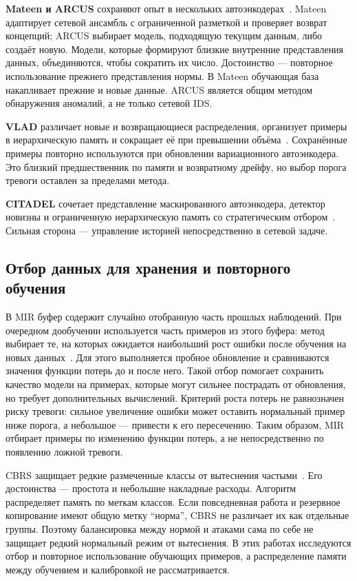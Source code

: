 \textbf{Mateen и ARCUS} сохраняют опыт в нескольких
автоэнкодерах~\cite{Mateen2024,ARCUS2022}. Mateen адаптирует
сетевой ансамбль с ограниченной разметкой и проверяет возврат
концепций; ARCUS выбирает модель, подходящую текущим данным,
либо создаёт новую. Модели, которые формируют близкие внутренние
представления данных, объединяются, чтобы сократить их число.
Достоинство --- повторное использование
прежнего представления нормы. В Mateen обучающая
база накапливает прежние и новые данные. ARCUS является общим
методом обнаружения аномалий, а не только сетевой IDS.

\textbf{VLAD} различает новые и возвращающиеся распределения,
организует примеры в иерархическую память и сокращает её при
превышении объёма~\cite{VLAD2023}. Сохранённые примеры повторно используются при
обновлении вариационного автоэнкодера. Это близкий предшественник
по памяти и возвратному дрейфу, но выбор порога тревоги
оставлен за пределами метода.

\textbf{CITADEL} сочетает представление маскированного автоэнкодера,
детектор новизны и ограниченную иерархическую память со
стратегическим отбором~\cite{CITADEL2025,CITADEL2026}. Сильная
сторона --- управление историей непосредственно в сетевой задаче.

\subsection{Отбор данных для хранения и повторного \texorpdfstring{\mbox{обучения}}{обучения}}
\label{subsec:related_retrieval}

В MIR буфер содержит случайно отобранную часть прошлых наблюдений.
При очередном дообучении используется часть примеров из этого
буфера: метод выбирает те, на которых ожидается наибольший рост
ошибки после обучения на новых данных~\cite{MIR2019}.
Для этого выполняется пробное обновление и сравниваются значения
функции потерь до и после него. Такой отбор помогает сохранить
качество модели на примерах, которые могут сильнее пострадать
от обновления, но требует дополнительных вычислений.
Критерий роста потерь не равнозначен риску тревоги:
сильное увеличение ошибки может оставить нормальный пример ниже
порога, а небольшое --- привести к его пересечению.
Таким образом, MIR отбирает примеры по изменению функции потерь,
а не непосредственно по появлению ложной тревоги.

CBRS защищает редкие размеченные классы от вытеснения
частыми~\cite{CBRS2020}. Его достоинства --- простота
и небольшие накладные расходы. Алгоритм распределяет память
по меткам классов. Если повседневная работа и резервное
копирование имеют общую метку \enquote{норма}, CBRS не различает
их как отдельные группы. Поэтому балансировка между нормой
и атаками сама по себе не защищает редкий нормальный режим
от вытеснения. В этих работах исследуются отбор и повторное
использование обучающих примеров, а распределение памяти
между обучением и калибровкой не рассматривается.


